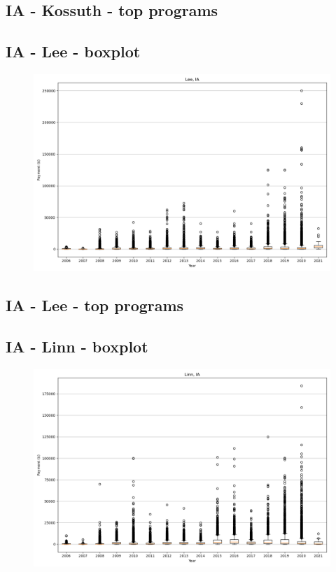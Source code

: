 \subsection*{IA - Kossuth - top programs}

\newpage
\subsection*{IA - Lee - boxplot}
\begin{figure}[h]
\centering
\includegraphics[width=7in]{../output/boxplots/counties/Lee-IA_boxplot.png}
\end{figure}


\subsection*{IA - Lee - top programs}

\newpage
\subsection*{IA - Linn - boxplot}
\begin{figure}[h]
\centering
\includegraphics[width=7in]{../output/boxplots/counties/Linn-IA_boxplot.png}
\end{figure}


